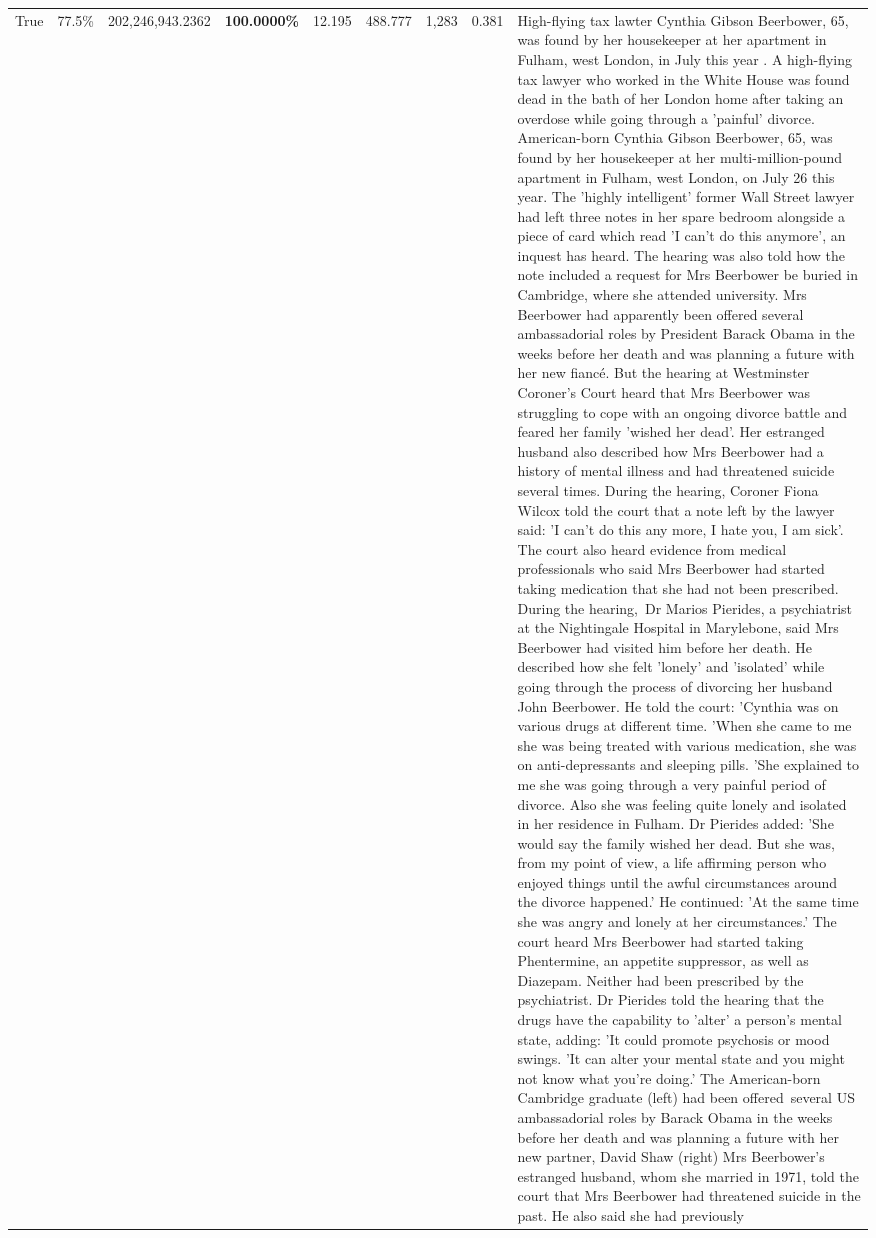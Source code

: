 \begin{table}[H]
\begin{tabular}{lllrlllll}
\cline{1-9}
True & 77.5\% & 202,246,943.2362 & \bfseries \color{red} 100.0000\% & 12.195 & 488.777 & 1,283 & 0.381 & High-flying tax lawter Cynthia Gibson Beerbower, 65, was found by her housekeeper at her apartment in Fulham, west London, in July this year . A high-flying tax lawyer who worked in the White House was found dead in the bath of her London home after taking an overdose while going through a 'painful' divorce. American-born Cynthia Gibson Beerbower, 65, was found by her housekeeper at her multi-million-pound apartment in Fulham, west London, on July 26 this year. The 'highly intelligent' former Wall Street lawyer had left three notes in her spare bedroom alongside a piece of card which read 'I can't do this anymore', an inquest has heard. The hearing was also told how the note included a request for Mrs Beerbower be buried in Cambridge, where she attended university. Mrs Beerbower had apparently been offered several ambassadorial roles by President Barack Obama in the weeks before her death and was planning a future with her new fiancé. But the hearing at Westminster Coroner's Court heard that Mrs Beerbower was struggling to cope with an ongoing divorce battle and feared her family 'wished her dead'. Her estranged husband also described how Mrs Beerbower had a history of mental illness and had threatened suicide several times. During the hearing, Coroner Fiona Wilcox told the court that a note left by the lawyer said: 'I can't do this any more, I hate you, I am sick'. The court also heard evidence from medical professionals who said Mrs Beerbower had started taking medication that she had not been prescribed. During the hearing, Dr Marios Pierides, a psychiatrist at the Nightingale Hospital in Marylebone, said Mrs Beerbower had visited him before her death. He described how she felt 'lonely' and 'isolated' while going through the process of divorcing her husband John Beerbower. He told the court: 'Cynthia was on various drugs at different time. 'When she came to me she was being treated with various medication, she was on anti-depressants and sleeping pills. 'She explained to me she was going through a very painful period of divorce. Also she was feeling quite lonely and isolated in her residence in Fulham. Dr Pierides added: 'She would say the family wished her dead. But she was, from my point of view, a life affirming person who enjoyed things until the awful circumstances around the divorce happened.' He continued: 'At the same time she was angry and lonely at her circumstances.' The court heard Mrs Beerbower had started taking Phentermine, an appetite suppressor, as well as Diazepam. Neither had been prescribed by the psychiatrist. Dr Pierides told the hearing that the drugs have the capability to 'alter' a person's mental state, adding: 'It could promote psychosis or mood swings. 'It can alter your mental state and you might not know what you're doing.' The American-born Cambridge graduate (left) had been offered several US ambassadorial roles by Barack Obama in the weeks before her death and was planning a future with her new partner, David Shaw (right) Mrs Beerbower's estranged husband, whom she married in 1971, told the court that Mrs Beerbower had threatened suicide in the past. He also said she had previously 
\end{tabular}
\end{table}
